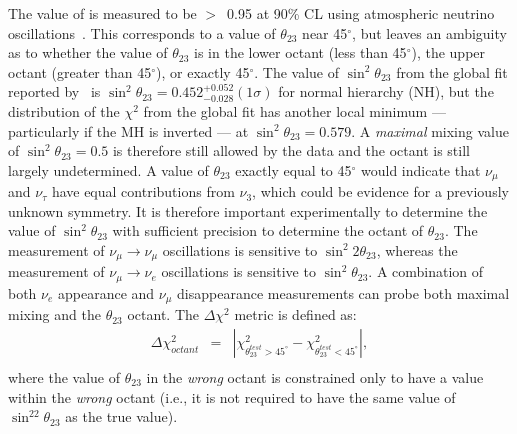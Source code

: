 The value of  is measured to be $>$~0.95 at 90\% CL 
using atmospheric neutrino oscillations~\cite{Abe:2011ph}. 
This corresponds to a value of 
$\theta_{23}$ near 45\mbox{$^{\circ}$}, but leaves an ambiguity
as to whether the value of $\theta_{23}$ is in the lower octant 
(less than 45\mbox{$^{\circ}$}), the upper octant (greater than 45\mbox{$^{\circ}$}),
or exactly 45\mbox{$^{\circ}$}. 
The value of $\sin^2 \theta_{23}$ from
the global fit reported by~\cite{Gonzalez-Garcia:2014bfa} is $\sin ^2 \theta_{23} = 0.452
^{+0.052} _{-0.028} (1 \sigma)$ for normal hierarchy (NH), but the distribution of the $\chi^2$ from
the global fit has another local minimum --- particularly if the MH 
is inverted --- at $\sin^2 \theta_{23} = 0.579$. A
\emph{maximal} mixing value of $\sin^2 \theta_{23} =0.5$ is therefore still allowed
by the data and the octant is still largely undetermined.
A value of $\theta_{23}$ exactly equal to 45\mbox{$^{\circ}$} would indicate that 
$\nu_{\mu}$ and $\nu_{\tau}$ have equal contributions from $\nu_3$,
which could be evidence for a previously unknown symmetry. 
It is
therefore important experimentally to determine the value of
$\sin ^2 \theta_{23}$ 
with sufficient precision to determine 
the octant of $\theta_{23}$. 
The measurement of $\nu_\mu \rightarrow \nu_\mu$ oscillations is
sensitive to $\sin ^2 2 \theta_{23}$, whereas the measurement of
$\nu_\mu \rightarrow \nu_e$ oscillations is sensitive to $\sin^2
\theta_{23}$. 
A combination of both $\nu_e$ appearance and $\nu_\mu$ disappearance
measurements can probe both maximal mixing and the $\theta_{23}$
octant.  The $\Delta\chi^2$ metric is defined as:
\begin{eqnarray}
\Delta\chi^2_{octant} & = & |\chi^2_{\theta_{23}^{test}>45^\circ} - \chi^2_{\theta_{23}^{test}<45^\circ}|, \\ \nonumber
\end{eqnarray}
where the value of $\theta_{23}$ in the \emph{wrong} octant is constrained 
only to have a value within the \emph{wrong} octant (i.e., it is not required
to have the same value of $\sin^22\theta_{23}$ as the true value).

